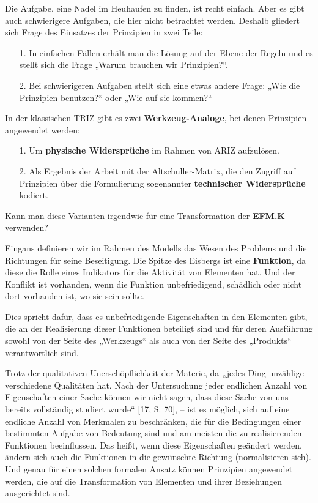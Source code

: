 \documentclass[11pt,a4paper]{article}
\begin{document}
Die Aufgabe, eine Nadel im Heuhaufen zu finden, ist recht einfach. Aber es
gibt auch schwierigere Aufgaben, die hier nicht betrachtet werden. Deshalb
gliedert sich Frage des Einsatzes der Prinzipien in zwei Teile:
\begin{itemize}
\item[1.] In einfachen Fällen erhält man die Lösung auf der Ebene der Regeln
  und es stellt sich die Frage „Warum brauchen wir Prinzipien?“.
\item[2.] Bei schwierigeren Aufgaben stellt sich eine etwas andere Frage: „Wie
  die Prinzipien benutzen?“ oder „Wie auf sie kommen?“
\end{itemize}
In der klassischen TRIZ gibt es zwei \textbf{Werkzeug-Analoge}, bei denen
Prinzipien angewendet werden:
\begin{itemize}
\item[1.] Um \textbf{physische Widersprüche} im Rahmen von ARIZ aufzulösen.
\item[2.] Als Ergebnis der Arbeit mit der Altschuller-Matrix, die den Zugriff
  auf Prinzipien über die Formulierung sogenannter \textbf{technischer
    Widersprüche} kodiert.
\end{itemize}
Kann man diese Varianten irgendwie für eine Transformation der \textbf{EFM.K}
verwenden? 

Eingans definieren wir im Rahmen des Modells das Wesen des Problems und die
Richtungen für seine Beseitigung. Die Spitze des Eisbergs ist eine
\textbf{Funktion}, da diese die Rolle eines Indikators für die Aktivität von
Elementen hat. Und der Konflikt ist vorhanden, wenn die Funktion
unbefriedigend, schädlich oder nicht dort vorhanden ist, wo sie sein sollte.

Dies spricht dafür, dass es unbefriedigende Eigenschaften in den Elementen
gibt, die an der Realisierung dieser Funktionen beteiligt sind und für deren
Ausführung sowohl von der Seite des „Werkzeugs“ als auch von der Seite des
„Produkts“ verantwortlich sind.

Trotz der qualitativen Unerschöpflichkeit der Materie, da „jedes Ding
unzählige verschiedene Qualitäten hat. Nach der Untersuchung jeder endlichen
Anzahl von Eigenschaften einer Sache können wir nicht sagen, dass diese Sache
von uns bereits vollständig studiert wurde“ [17, S. 70], -- ist es möglich,
sich auf eine endliche Anzahl von Merkmalen zu beschränken, die für die
Bedingungen einer bestimmten Aufgabe von Bedeutung sind und am meisten die zu
realisierenden Funktionen beeinflussen. Das heißt, wenn diese Eigenschaften
geändert werden, ändern sich auch die Funktionen in die gewünschte Richtung
(normalisieren sich). Und genau für einen solchen formalen Ansatz können
Prinzipien angewendet werden, die auf die Transformation von Elementen und
ihrer Beziehungen ausgerichtet sind.
\end{document}
